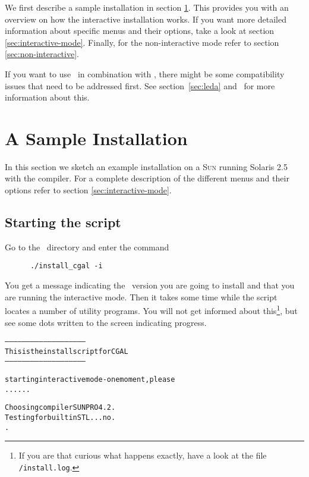 We first describe a sample installation in section
\ref{sec:sample-inst}. This provides you with an overview on how the
interactive installation works. If you want more detailed information
about specific menus and their options, take a look at section
\ref{sec:interactive-mode}. Finally, for the non-interactive mode
refer to section \ref{sec:non-interactive}.

If you want to use \leda\ in combination with \cgal, there might be
some compatibility issues that need to be addressed first. See
section~\ref{sec:leda} and \compilerpage\ for more information about
this.

\section{A Sample Installation}\label{sec:sample-inst}

In this section we sketch an example installation on a \textsc{Sun}
running Solaris 2.5 with the  compiler. For a complete
description of the different menus and their options refer to section
\ref{sec:interactive-mode}.

\subsection{Starting the script}

Go to the \cgaldir\ directory and enter the command
\begin{verbatim}
      ./install_cgal -i
\end{verbatim}

You get a message indicating the \cgal\ version you are going to
install and that you are running the interactive mode. Then it takes
some time while the script locates a number of utility programs. You
will not get informed about this\footnote{If you are that curious what
  happens exactly, have a look at the file
  \texttt{\cgaldir/install.log}.}, but see some dots written to the
screen indicating progress.

{\scriptsize
\begin{alltt}
--------------------------------------------------------
  This is the install script for CGAL \cgalrelease
--------------------------------------------------------

starting interactive mode - one moment, please
......

  Choosing compiler SUNPRO 4.2.
  Testing for builtin STL ... no.
.
\end{alltt}}
  
